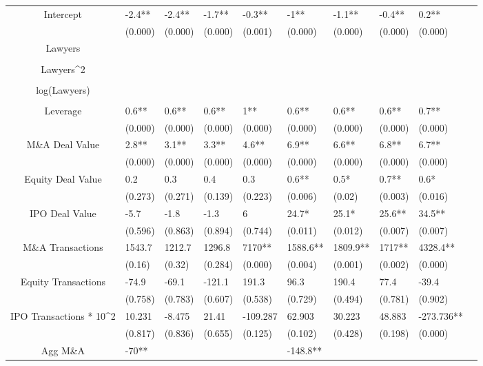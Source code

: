 \documentclass{article}
\begin{document}
\begin{table}[H]
\begin{tabular}{|clllllllll|}
Intercept & -2.4** & -2.4** & -1.7** & -0.3** & -1** & -1.1** & -0.4** & 0.2** & \\ 
   & (0.000) & (0.000) & (0.000) & (0.001) & (0.000) & (0.000) & (0.000) & (0.000) & \\ 
  Lawyers &  &  &  &  &  &  &  &  & \\ 
   &  &  &  &  &  &  &  &  & \\ 
  Lawyers^2 &  &  &  &  &  &  &  &  & \\ 
   &  &  &  &  &  &  &  &  & \\ 
  log(Lawyers) &  &  &  &  &  &  &  &  & \\ 
   &  &  &  &  &  &  &  &  & \\ 
  Leverage & 0.6** & 0.6** & 0.6** & 1** & 0.6** & 0.6** & 0.6** & 0.7** & \\ 
   & (0.000) & (0.000) & (0.000) & (0.000) & (0.000) & (0.000) & (0.000) & (0.000) & \\ 
  M\&A Deal Value & 2.8** & 3.1** & 3.3** & 4.6** & 6.9** & 6.6** & 6.8** & 6.7** & \\ 
   & (0.000) & (0.000) & (0.000) & (0.000) & (0.000) & (0.000) & (0.000) & (0.000) & \\ 
  Equity Deal Value & 0.2 & 0.3 & 0.4 & 0.3 & 0.6** & 0.5* & 0.7** & 0.6* & \\ 
   & (0.273) & (0.271) & (0.139) & (0.223) & (0.006) & (0.02) & (0.003) & (0.016) & \\ 
  IPO Deal Value & -5.7 & -1.8 & -1.3 & 6 & 24.7* & 25.1* & 25.6** & 34.5** & \\ 
   & (0.596) & (0.863) & (0.894) & (0.744) & (0.011) & (0.012) & (0.007) & (0.007) & \\ 
  M\&A Transactions & 1543.7 & 1212.7 & 1296.8 & 7170** & 1588.6** & 1809.9** & 1717** & 4328.4** & \\ 
   & (0.16) & (0.32) & (0.284) & (0.000) & (0.004) & (0.001) & (0.002) & (0.000) & \\ 
  Equity Transactions & -74.9 & -69.1 & -121.1 & 191.3 & 96.3 & 190.4 & 77.4 & -39.4 & \\ 
   & (0.758) & (0.783) & (0.607) & (0.538) & (0.729) & (0.494) & (0.781) & (0.902) & \\ 
  IPO Transactions * 10^2 & 10.231 & -8.475 & 21.41 & -109.287 & 62.903 & 30.223 & 48.883 & -273.736** & \\ 
   & (0.817) & (0.836) & (0.655) & (0.125) & (0.102) & (0.428) & (0.198) & (0.000) & \\ 
  Agg M\&A & -70** &  &  &  & -148.8** &  &  &  & \\ 

\end{tabular}
\end{table}
\end{document}
